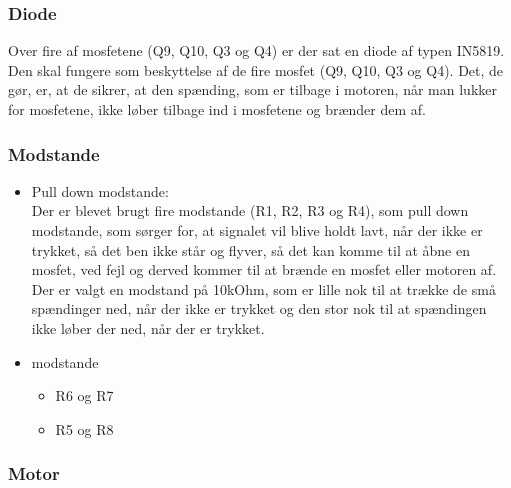 \subsubsection{Diode}
Over fire af mosfetene (Q9, Q10, Q3 og Q4) er der sat en diode af typen IN5819. Den skal fungere som beskyttelse af de fire mosfet (Q9, Q10, Q3 og Q4). Det, de gør, er, at de sikrer, at den spænding, som er tilbage i motoren, når man lukker for mosfetene, ikke løber tilbage ind i mosfetene og brænder dem af.

\subsubsection{Modstande}
\begin{itemize}
	\item Pull down modstande:\\
	Der er blevet brugt fire modstande (R1, R2, R3 og R4), som pull down modstande, som sørger for, at signalet vil blive holdt lavt, når der ikke er trykket, så det ben ikke står og flyver, så det kan komme til at åbne en mosfet, ved fejl og derved kommer til at brænde en mosfet eller motoren af. Der er valgt en modstand på 10kOhm, som er lille nok til at trække de små spændinger ned, når der ikke er trykket og den stor nok til at spændingen ikke løber der ned, når der er trykket.
	\item modstande
	\begin{itemize}
		\item R6 og R7
		
		\item R5 og R8
	\end{itemize}
	
	
\end{itemize}
\subsubsection{Motor}